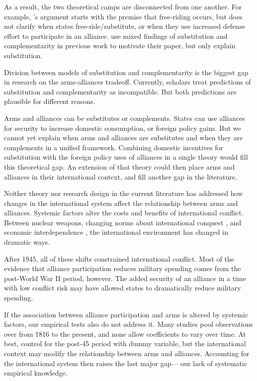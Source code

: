 \documentclass[12pt]{article}
\begin{document}
As a result, the two theoretical camps are disconnected from one another. 
For example, \citet{Horowitzetal2017}'s argument starts with the premise that free-riding occurs, but does not clarify when states free-ride/substitute, or when they use increased defense effort to participate in an alliance. 
\citet{DigiuseppePoast2016} use mixed findings of substitution and complementarity in previous work to motivate their paper, but only explain substitution. 


Division between models of substitution and complementarity is the biggest gap in research on the arms-alliances tradeoff. 
Currently, scholars treat predictions of substitution and complementarity as incompatible. 
But both predictions are plausible for different reasons. 


Arms and alliances can be substitutes or complements.  
States can use alliances for security to increase domestic consumption, or foreign policy gains. 
But we cannot yet explain when arms and alliances are substitutes and when they are complements in a unified framework. 
Combining domestic incentives for substitution with the foreign policy uses of alliances in a single theory would fill this theoretical gap. 
An extension of that theory could then place arms and alliances in their international context, and fill another gap in the literature. 


Neither theory nor research design in the current literature has addressed how changes in the international system affect the relationship between arms and alliances. 
Systemic factors alter the costs and benefits of international conflict.
Between nuclear weapons, changing norms about international conquest \citep{Fazal2011}, and economic interdependence \citep{Frieden2006}, the international environment has changed in dramatic ways.


After 1945, all of these shifts constrained international conflict. 
Most of the evidence that alliance participation reduces military spending comes from the post-World War II period, however.  
The added security of an alliance in a time with low conflict risk may have allowed states to dramatically reduce military spending. 


If the association between alliance participation and arms is altered by systemic factors, our empirical tests also do not address it. 
Many studies pool observations over from 1816 to the present, and none allow coefficients to vary over time. 
At best, \citet{Horowitzetal2017} control for the post-45 period with dummy variable, but the international context may modify the relationship between arms and alliances. 
Accounting for the international system then raises the last major gap--- our lack of systematic empirical knowledge. 
\end{document}
